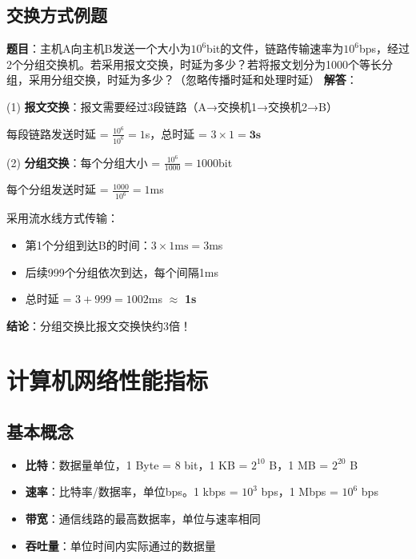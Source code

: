 \documentclass[12pt,a4paper,openany]{ctexbook}
\begin{document}
\subsection{交换方式例题}
\begin{examplebox}[例题1.1 分组交换时延计算]
\textbf{题目}：主机A向主机B发送一个大小为$10^6$bit的文件，链路传输速率为$10^6$bps，经过2个分组交换机。若采用报文交换，时延为多少？若将报文划分为1000个等长分组，采用分组交换，时延为多少？（忽略传播时延和处理时延）
\tcblower
\textbf{解答}：

(1) \textbf{报文交换}：报文需要经过3段链路（A→交换机1→交换机2→B）
\begin{center}
\end{center}
每段链路发送时延 = $\frac{10^6}{10^6} = 1$s，总时延 = $3 \times 1 = \textbf{3s}$

(2) \textbf{分组交换}：每个分组大小 = $\frac{10^6}{1000} = 1000$bit

每个分组发送时延 = $\frac{1000}{10^6} = 1$ms

采用流水线方式传输：
\begin{itemize}[itemsep=0pt]
    \item 第1个分组到达B的时间：$3 \times 1\text{ms} = 3$ms
    \item 后续999个分组依次到达，每个间隔1ms
    \item 总时延 = $3 + 999 = 1002$ms $\approx$ \textbf{1s}
\end{itemize}

\textbf{结论}：分组交换比报文交换快约3倍！
\end{examplebox}

\section{计算机网络性能指标}
\subsection{基本概念}
\begin{itemize}[leftmargin=2em,itemsep=0pt]
    \item \textbf{比特}：数据量单位，1 Byte = 8 bit，1 KB = $2^{10}$ B，1 MB = $2^{20}$ B
    \item \textbf{速率}：比特率/数据率，单位bps。1 kbps = $10^3$ bps，1 Mbps = $10^6$ bps
    \item \textbf{带宽}：通信线路的最高数据率，单位与速率相同
    \item \textbf{吞吐量}：单位时间内实际通过的数据量
\end{itemize}
\end{document}
